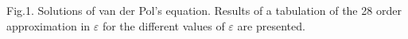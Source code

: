 \setlength{\textwidth}{14.0cm}
\setlength{\topmargin}{-1.0cm}
\setlength{\textheight}{21.0cm}


\thispagestyle{empty}

\noindent
Fig.1. Solutions of van der Pol's equation.
Results of a tabulation of the 28 order approximation in $\varepsilon$
for the different values of $\varepsilon$ are presented.

\begin{figure}
\vspace{1cm}
\begin{center}



\end{center}
\end{figure}



